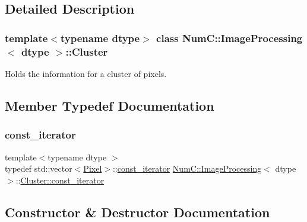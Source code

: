 \subsection{Detailed Description}
\subsubsection*{template$<$typename dtype$>$\newline
class Num\+C\+::\+Image\+Processing$<$ dtype $>$\+::\+Cluster}

Holds the information for a cluster of pixels. 

\subsection{Member Typedef Documentation}
\mbox{\label{class_num_c_1_1_image_processing_1_1_cluster_a15d2f9ebeba9062779e57a6fdce9faa0}} 
\subsubsection{\texorpdfstring{const\+\_\+iterator}{const\_iterator}}
{\footnotesize\ttfamily template$<$typename dtype $>$ \\
typedef std\+::vector$<$\mbox{\hyperlink{class_num_c_1_1_image_processing_1_1_pixel}{Pixel}}$>$\+::\mbox{\hyperlink{class_num_c_1_1_image_processing_1_1_cluster_a15d2f9ebeba9062779e57a6fdce9faa0}{const\+\_\+iterator}} \mbox{\hyperlink{class_num_c_1_1_image_processing}{Num\+C\+::\+Image\+Processing}}$<$ dtype $>$\+::\mbox{\hyperlink{class_num_c_1_1_image_processing_1_1_cluster_a15d2f9ebeba9062779e57a6fdce9faa0}{Cluster\+::const\+\_\+iterator}}}



\subsection{Constructor \& Destructor Documentation}
\mbox{\label{class_num_c_1_1_image_processing_1_1_cluster_a9f76063fa94efeba8dc19fa7dafa01dd}} 
